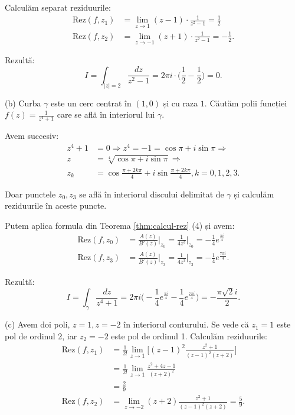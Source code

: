 \documentclass[12pt,a4paper]{article}
\newcommand\Rez{\mathrm{Rez}}
\theoremstyle{dotless}
\theoremstyle{dotlessdr}
\begin{document}
Calculăm separat reziduurile:
\begin{align*}
  \Rez(f, z_1) &= \lim_{z \to 1} (z - 1) \cdot \frac{1}{z^2 - 1} = \frac{1}{2} \\
  \Rez(f, z_2) &= \lim_{z \to -1} (z + 1) \cdot \frac{1}{z^2 - 1} = -\frac{1}{2}.
\end{align*}

Rezultă:
\[
  I = \int_{|z| = 2} \frac{dz}{z^2 - 1} = 2 \pi i \cdot \Big( \frac{1}{2} - \frac{1}{2} \Big) = 0.
\]

\vspace{1cm}

(b) Curba $ \gamma $ este un cerc centrat în $ (1, 0) $ și cu raza $ 1 $. Căutăm
polii funcției $ f(z) = \frac{1}{z^4 + 1} $ care se află în interiorul lui $ \gamma $.

Avem succesiv:
\begin{align*}
  z^4 + 1 &= 0 \Rightarrow z^4 = -1 = \cos \pi + i \sin \pi \Rightarrow \\
  z &= \sqrt[4]{\cos \pi + i \sin \pi} \Rightarrow \\
  z_k &= \cos \frac{\pi + 2k\pi}{4} + i \sin \frac{\pi + 2k\pi}{4}, k = 0, 1, 2, 3.
\end{align*}

Doar punctele $ z_0, z_3 $ se află în interiorul discului delimitat de $ \gamma $
și calculăm reziduurile în aceste puncte.

Putem aplica formula din Teorema \ref{thm:calcul-rez} (4) și avem:
\begin{align*}
  \Rez(f, z_0) &= \frac{A(z)}{B'(z)}\Big|_{z_0} = \frac{1}{4z^3}\Big|_{z_0} %
                 = -\frac{1}{4} e^{\frac{\pi i}{4}} \\
  \Rez(f, z_3) &= \frac{A(z)}{B'(z)}\Big|_{z_3} = \frac{1}{4z^3}\Big|_{z_3} %
                 = - \frac{1}{4} e^{\frac{7 \pi i}{4}}.
\end{align*}

Rezultă:
\[
  I = \int_\gamma \frac{dz}{z^4 + 1} = %
  2 \pi i \Big( -\frac{1}{4} e^{\frac{\pi i}{4}} - \frac{1}{4} e^{\frac{7 \pi i}{4}} \Big) = %
  -\frac{\pi \sqrt{2} i}{2}.
\]

\vspace{1cm}

(c) Avem doi poli, $ z = 1, z = -2 $ în interiorul conturului. Se vede că $ z_1 = 1 $
este pol de ordinul 2, iar $ z_2 = -2 $ este pol de ordinul 1. Calculăm reziduurile:
\begin{align*}
  \Rez(f, z_1) &= \frac{1}{2!} \lim_{z \to 1} \Big[ (z - 1)^2 \frac{z^2 + 1}{(z - 1)^2(z + 2)} \Big] \\
               &= \frac{1}{2!} \lim_{z \to 1} \frac{z^2 + 4z - 1}{(z + 2)^2} \\
               &= \frac{2}{9} \\
  \Rez(f, z_2) &= \lim_{z \to -2} (z + 2) \frac{z^2 + 1}{(z - 1)^2(z + 2)} = \frac{5}{9}.
\end{align*}
\end{document}
